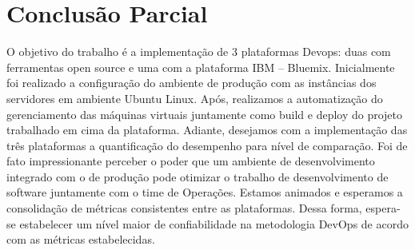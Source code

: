 \chapter{Conclusão Parcial}

 O objetivo do trabalho é a implementação de 3 plataformas Devops: 
 duas com ferramentas open source e uma com a plataforma IBM – 
 Bluemix. Inicialmente foi realizado a configuração do ambiente de 
 produção com as instâncias dos servidores em ambiente Ubuntu 
 Linux. Após, realizamos a automatização do gerenciamento das 
 máquinas virtuais juntamente como build e deploy do projeto 
 trabalhado em cima da plataforma. Adiante, desejamos com a 
 implementação das três plataformas a quantificação do desempenho 
 para nível de comparação. Foi de fato impressionante perceber 
 o poder que um ambiente de desenvolvimento integrado com o de 
 produção   pode otimizar o trabalho de desenvolvimento de software
 juntamente com o time de Operações. Estamos animados e esperamos a 
 consolidação de métricas consistentes entre as plataformas. Dessa 
 forma, espera-se estabelecer um nível maior de confiabilidade na 
 metodologia DevOps de acordo com as métricas estabelecidas.
